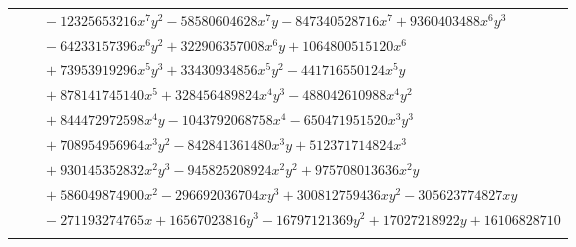 \documentclass[11pt]{article}
\begin{document}
\begin{longtable}{@{}ll@{}}
 & $\quad -12325653216x^{7}y^{2}-58580604628x^{7}y-847340528716x^{7}+9360403488x^{6}y^{3}$\\
 & $\quad -64233157396x^{6}y^{2}+322906357008x^{6}y+1064800515120x^{6}$\\
 & $\quad +73953919296x^{5}y^{3}+33430934856x^{5}y^{2}-441716550124x^{5}y$\\
 & $\quad +878141745140x^{5}+328456489824x^{4}y^{3}-488042610988x^{4}y^{2}$\\
 & $\quad +844472972598x^{4}y-1043792068758x^{4}-650471951520x^{3}y^{3}$\\
 & $\quad +708954956964x^{3}y^{2}-842841361480x^{3}y+512371714824x^{3}$\\
 & $\quad +930145352832x^{2}y^{3}-945825208924x^{2}y^{2}+975708013636x^{2}y$\\
 & $\quad +586049874900x^{2}-296692036704xy^{3}+300812759436xy^{2}-305623774827xy$\\
 & $\quad -271193274765x+16567023816y^{3}-16797121369y^{2}+17027218922y+16106828710$\\
\addlinespace[3pt]
\end{longtable}
\endgroup
\end{document}
